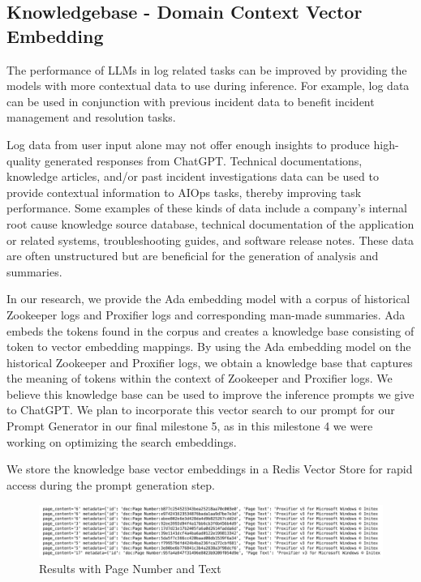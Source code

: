 \documentclass[conference]{IEEEtran}
\begin{document}
\subsection{Knowledgebase - Domain Context Vector Embedding}

The performance of LLMs in log related tasks can be improved by providing the models with more contextual data to use during inference. For example, log data can be used in conjunction with previous incident data to benefit incident management and resolution tasks.

Log data from user input alone may not offer enough insights to produce high-quality generated responses from ChatGPT. Technical documentations, knowledge articles, and/or past incident investigations data can be used to provide contextual information to AIOps tasks, thereby improving task performance. Some examples of these kinds of data include a company's internal root cause knowledge source database, technical documentation of the application or related systems, troubleshooting guides, and software release notes. These data are often unstructured but are beneficial for the generation of analysis and summaries. \cite{saha2022mining}

In our research, we provide the Ada embedding model with a corpus of historical Zookeeper logs and Proxifier logs and corresponding man-made summaries. Ada embeds the tokens found in the corpus and creates a knowledge base consisting of token to vector embedding mappings. By using the Ada embedding model on the historical Zookeeper and Proxifier logs, we obtain a knowledge base that captures the meaning of tokens within the context of Zookeeper and Proxifier logs. We believe this knowledge base can be used to improve the inference prompts we give to ChatGPT. We plan to incorporate this vector search to our prompt for our Prompt Generator in our final milestone 5, as in this milestone 4 we were working on optimizing the search embeddings.

We store the knowledge base vector embeddings in a Redis Vector Store for rapid access during the prompt generation step.

\begin{figure}[h]
    \centering
    \includegraphics[width=\textwidth]{pagenumber.png}
    \caption{Results with Page Number and Text}
    \label{fig:pagenumber-label}
\end{figure}
\end{document}
